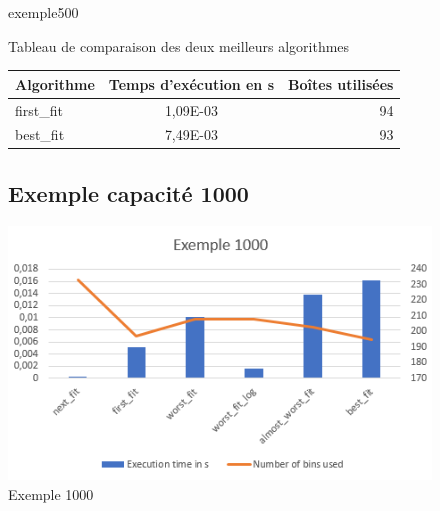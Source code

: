 \documentclass{article}
\begin{document}
\begin{figure}
\begin{center}


exemple500

Tableau de comparaison des deux meilleurs algorithmes

\begin{tabular}{|l|c|r|}
  \hline
  Algorithme & Temps d'exécution en s & Boîtes utilisées \\
  \hline
  first\_fit & 1,09E-03 & 94 \\
  best\_fit & 7,49E-03  & 93 \\
  \hline
\end{tabular}


\subsection{Exemple capacité 1000}
\includegraphics{exemple1000.png}
\end{center}
\caption{Exemple 1000}
\end{figure}
\end{document}
